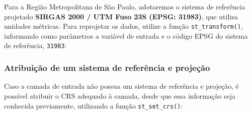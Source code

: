 \documentclass[
  letterpaper,
  DIV=11,
  numbers=noendperiod]{scrreprt}
\newenvironment{Shaded}{\begin{snugshade}}{\end{snugshade}}
\newcommand{\AttributeTok}[1]{\textcolor[rgb]{0.40,0.45,0.13}{#1}}
\newcommand{\CommentTok}[1]{\textcolor[rgb]{0.37,0.37,0.37}{#1}}
\newcommand{\DecValTok}[1]{\textcolor[rgb]{0.68,0.00,0.00}{#1}}
\newcommand{\FunctionTok}[1]{\textcolor[rgb]{0.28,0.35,0.67}{#1}}
\newcommand{\NormalTok}[1]{\textcolor[rgb]{0.00,0.23,0.31}{#1}}
\newcommand{\OtherTok}[1]{\textcolor[rgb]{0.00,0.23,0.31}{#1}}
\newcommand{\SpecialCharTok}[1]{\textcolor[rgb]{0.37,0.37,0.37}{#1}}
\begin{document}
Para a Região Metropolitana de São Paulo, adotaremos o sistema de
referência projetado \textbf{SIRGAS 2000 / UTM Fuso 23S (EPSG: 31983)},
que utiliza unidades métricas. Para reprojetar os dados, utilize a
função \texttt{st\_transform()}, informando como parâmetros a variável
de entrada e o código EPSG do sistema de referência, \texttt{31983}:

\begin{Shaded}
\end{Shaded}

\subsubsection{\texorpdfstring{\textbf{Atribuição de um sistema de
referência e
projeção}}{Atribuição de um sistema de referência e projeção}}\label{atribuiuxe7uxe3o-de-um-sistema-de-referuxeancia-e-projeuxe7uxe3o}

Caso a camada de entrada não possua um sistema de referência e projeção,
é possível atribuir o CRS adequado à camada, desde que essa informação
seja conhecida previamente, utilizando a função \texttt{st\_set\_crs()}:
\end{document}
